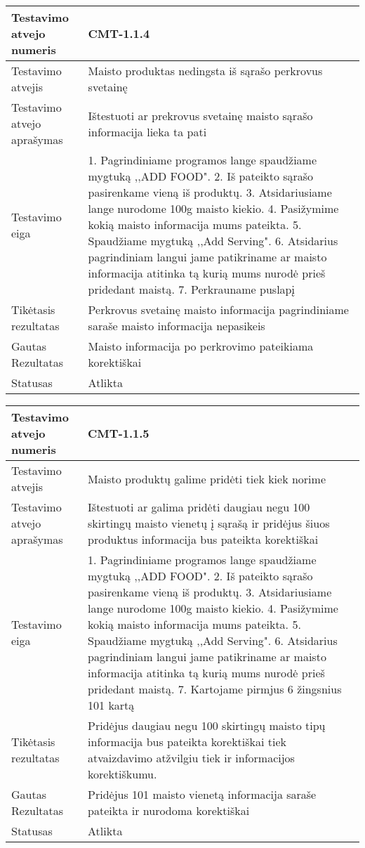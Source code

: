 \documentclass[oneside]{VUMIFPSkursinis}
\begin{document}
\begin{center}
    \begin{tabular}{ |p{5cm}|p{13cm}|}
    \hline
        Testavimo atvejo numeris & CMT-1.1.4  \\ \hline
        Testavimo atvejis & Maisto produktas nedingsta iš sąrašo perkrovus svetainę  \\ \hline
        Testavimo atvejo aprašymas & Ištestuoti ar prekrovus svetainę maisto sąrašo informacija lieka ta pati  \\ \hline
        Testavimo eiga &  1. Pagrindiniame programos lange spaudžiame mygtuką ,,ADD FOOD". 
				2. Iš pateikto sąrašo pasirenkame vieną iš produktų. 
				3. Atsidariusiame lange nurodome 100g maisto kiekio.
				4. Pasižymime kokią maisto informacija mums pateikta. 
				5. Spaudžiame mygtuką ,,Add Serving".
				6. Atsidarius pagrindiniam langui jame patikriname ar maisto informacija atitinka tą kurią mums nurodė prieš pridedant maistą.
				7. Perkrauname puslapį\\ \hline
        Tikėtasis rezultatas &  Perkrovus svetainę maisto informacija pagrindiniame saraše maisto informacija nepasikeis\\ \hline
        Gautas Rezultatas & Maisto informacija po perkrovimo pateikiama korektiškai  \\ \hline
        Statusas & Atlikta  \\ \hline
    \hline
    \end{tabular}
\end{center}

\begin{center}
    \begin{tabular}{ |p{5cm}|p{13cm}|}
    \hline
        Testavimo atvejo numeris & CMT-1.1.5  \\ \hline
        Testavimo atvejis & Maisto produktų galime pridėti tiek kiek norime  \\ \hline
        Testavimo atvejo aprašymas & Ištestuoti ar galima pridėti daugiau negu 100 skirtingų maisto vienetų į sąrašą ir pridėjus šiuos produktus informacija bus pateikta korektiškai \\ \hline
        Testavimo eiga &  1. Pagrindiniame programos lange spaudžiame mygtuką ,,ADD FOOD". 
				2. Iš pateikto sąrašo pasirenkame vieną iš produktų. 
				3. Atsidariusiame lange nurodome 100g maisto kiekio.
				4. Pasižymime kokią maisto informacija mums pateikta. 
				5. Spaudžiame mygtuką ,,Add Serving".
				6. Atsidarius pagrindiniam langui jame patikriname ar maisto informacija atitinka tą kurią mums nurodė prieš pridedant maistą.
				7. Kartojame pirmjus 6 žingsnius 101 kartą\\ \hline
        Tikėtasis rezultatas & Pridėjus daugiau negu 100 skirtingų maisto tipų informacija bus pateikta korektiškai tiek atvaizdavimo atžvilgiu tiek ir informacijos korektiškumu.\\ \hline
        Gautas Rezultatas & Pridėjus 101 maisto vienetą informacija saraše pateikta ir nurodoma korektiškai  \\ \hline
        Statusas & Atlikta  \\ \hline
    \hline
    \end{tabular}
\end{center}
\end{document}
